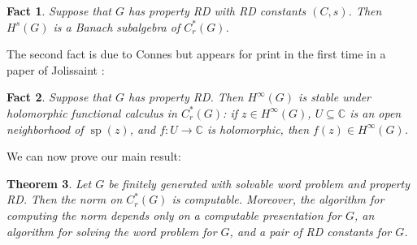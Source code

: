 \documentclass[10pt,a4paper]{amsart}
\DeclareMathOperator{\spec}{sp}
\newcommand{\Cr}{C^*_r(G)}
\theoremstyle{plain}
\newtheorem{theorem}{Theorem}[section]
\newtheorem{fact}[theorem]{Fact}
\theoremstyle{definition}
\numberwithin{equation}{section}
\begin{document}
\begin{fact}\label{fact1}
Suppose that $G$ has property RD with RD constants $(C,s)$.  Then $H^s(G)$ is a Banach subalgebra of $C^*_r(G)$.  
\end{fact}

The second fact is due to Connes but appears for print in the first time in a paper of Jolissaint \cite[Theorem A]{jolissaint2}:

\begin{fact}\label{fact2}
Suppose that $G$ has property RD.  Then $H^\infty(G)$ is stable under holomorphic functional calculus in $\Cr$:  if $z\in H^\infty(G)$, $U\subseteq \mathbb{C}$ is an open neighborhood of $\spec(z)$, and $f:U\to \mathbb{C}$ is holomorphic, then $f(z)\in H^\infty(G)$.
\end{fact}

We can now prove our main result:


\begin{theorem}\label{thm:main}
Let $G$ be finitely generated with solvable word problem and property RD.  Then the norm on $\Cr$ is computable.  Moreover, the algorithm for computing the norm depends only on a computable presentation for $G$, an algorithm for solving the word problem for $G$, and a pair of RD constants for $G$.
\end{theorem}
\end{document}
